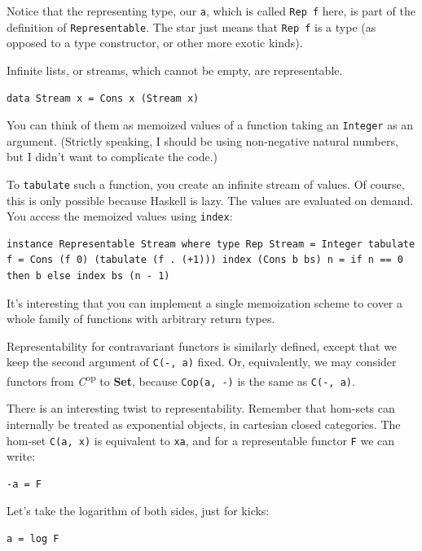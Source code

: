 Notice that the representing type, our \texttt{a}, which is called
\texttt{Rep\ f} here, is part of the definition of
\texttt{Representable}. The star just means that \texttt{Rep\ f} is a
type (as opposed to a type constructor, or other more exotic kinds).

Infinite lists, or streams, which cannot be empty, are representable.

\begin{verbatim}
data Stream x = Cons x (Stream x)
\end{verbatim}

You can think of them as memoized values of a function taking an
\texttt{Integer} as an argument. (Strictly speaking, I should be using
non-negative natural numbers, but I didn't want to complicate the code.)

To \texttt{tabulate} such a function, you create an infinite stream of
values. Of course, this is only possible because Haskell is lazy. The
values are evaluated on demand. You access the memoized values using
\texttt{index}:

\begin{verbatim}
instance Representable Stream where type Rep Stream = Integer tabulate f = Cons (f 0) (tabulate (f . (+1))) index (Cons b bs) n = if n == 0 then b else index bs (n - 1)
\end{verbatim}

It's interesting that you can implement a single memoization scheme to
cover a whole family of functions with arbitrary return types.

Representability for contravariant functors is similarly defined, except
that we keep the second argument of \texttt{C(-,\ a)} fixed. Or,
equivalently, we may consider functors from \emph{C}\textsuperscript{op}
to \textbf{Set}, because \texttt{Cop(a,\ -)} is the same as
\texttt{C(-,\ a)}.

There is an interesting twist to representability. Remember that
hom-sets can internally be treated as exponential objects, in cartesian
closed categories. The hom-set \texttt{C(a,\ x)} is equivalent to
\texttt{xa}, and for a representable functor \texttt{F} we can write:

\begin{verbatim}
-a = F
\end{verbatim}

Let's take the logarithm of both sides, just for kicks:

\begin{verbatim}
a = log F
\end{verbatim}


